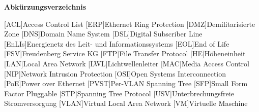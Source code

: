 \textbf{\Huge Abkürzungsverzeichnis}\\
\begin{singlespace}
\begin{acronym}
[ACL]{Access Control List}
[ERP]{Ethernet Ring Protection}
[DMZ]{Demilitarisierte Zone}
[DNS]{Domain Name System}
[DSL]{Digital Subscriber Line}
[EnLIs]{Energienetz des Leit- und Informationssystems}
[EOL]{End of Life}
[FSV]{Freudenberg Service KG}
[FTP]{File Transfer Protocol}
[HE]{Höheneinheit}
[LAN]{Local Area Network}
[LWL]{Lichtwellenleiter}
[MAC]{Media Access Control}
[NIP]{Network Intrusion Protection}
[OSI]{Open Systems Interconnection}
[PoE]{Power over Ethernet}
[PVST]{Per-VLAN Spanning Tree}
[SFP]{Small Form Factor Pluggable}
[STP]{Spanning Tree Protocol}
[USV]{Unterbrechungsfreie Stromversorgung}
[VLAN]{Virtual Local Area Network}
[VM]{Virtuelle Maschine}
\end{acronym}
\end{singlespace}